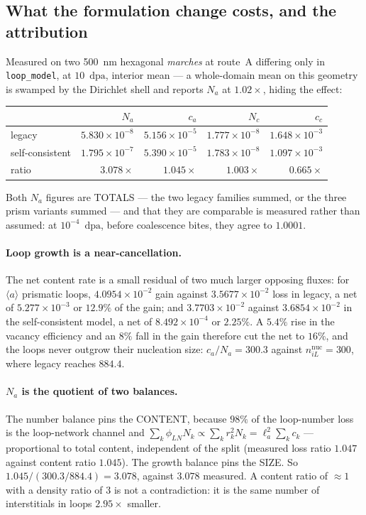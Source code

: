 \documentclass[11pt,a4paper]{article}
\newcommand{\code}[1]{\texttt{\small #1}}
\newcommand{\dpa}{\ensuremath{\mathrm{dpa}}}
\newcommand{\aloop}{\ensuremath{\langle a\rangle}}
\begin{document}
\subsection{What the formulation change costs, and the attribution}

Measured on two 500~nm hexagonal \emph{marches} at route~A differing only in
\code{loop\_model}, at $10$~\dpa, interior mean --- a whole-domain mean on this
geometry is swamped by the Dirichlet shell and reports $N_a$ at $1.02\times$,
hiding the effect:

\begin{center}
\begin{tabular}{@{}lrrrr@{}}
\toprule
 & $N_a$ & $c_a$ & $N_c$ & $c_c$ \\
\midrule
legacy          & $5.830\times10^{-8}$ & $5.156\times10^{-5}$ & $1.777\times10^{-8}$ & $1.648\times10^{-3}$ \\
self-consistent & $1.795\times10^{-7}$ & $5.390\times10^{-5}$ & $1.783\times10^{-8}$ & $1.097\times10^{-3}$ \\
ratio           & $\mathbf{3.078\times}$ & $1.045\times$ & $1.003\times$ & $\mathbf{0.665\times}$ \\
\bottomrule
\end{tabular}
\end{center}

Both $N_a$ figures are TOTALS --- the two legacy families summed, or the three
prism variants summed --- and that they are comparable is measured rather than
assumed: at $10^{-4}$~\dpa, before coalescence bites, they agree to $1.0001$.

\paragraph{Loop growth is a near-cancellation.} The net content rate is a small
residual of two much larger opposing fluxes: for \aloop{} prismatic loops,
$4.0954\times10^{-2}$ gain against $3.5677\times10^{-2}$ loss in legacy, a net
of $5.277\times10^{-3}$ or $12.9\%$ of the gain; and $3.7703\times10^{-2}$
against $3.6854\times10^{-2}$ in the self-consistent model, a net of
$8.492\times10^{-4}$ or $2.25\%$. A $5.4\%$ rise in the vacancy efficiency and
an $8\%$ fall in the gain therefore cut the net to $16\%$, and the loops never
outgrow their nucleation size: $c_a/N_a = 300.3$ against
$n^{\mathrm{nuc}}_{iL} = 300$, where legacy reaches $884.4$.

\paragraph{$N_a$ is the quotient of two balances.} The number balance pins the
CONTENT, because $98\%$ of the loop-number loss is the loop-network channel and
$\sum_k \phi_{LN}N_k \propto \sum_k r_k^2 N_k = \ell_a^2\sum_k c_k$ ---
proportional to total content, independent of the split (measured loss ratio
$1.047$ against content ratio $1.045$). The growth balance pins the SIZE. So
$1.045/(300.3/884.4) = 3.078$, against $3.078$ measured. A content ratio of
$\approx 1$ with a density ratio of $3$ is not a contradiction: it is the same
number of interstitials in loops $2.95\times$ smaller.
\end{document}
